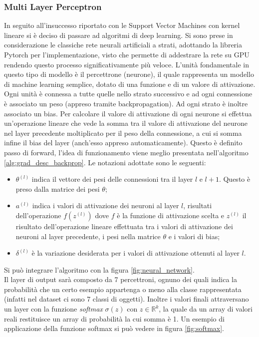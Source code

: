 \subsubsection{Multi Layer Perceptron}
In seguito all'insuccesso riportato con le Support Vector Machines con kernel lineare si è deciso di passare ad algoritmi di deep learning. Si sono prese in considerazione le classiche rete neurali artificiali a strati, adottando la libreria Pytorch per l'implementazione, visto che permette di addestrare la rete su GPU rendendo questo processo significativamente più veloce.
L'unità fondamentale in questo tipo di modello è il percettrone (neurone), il quale rappresenta un modello di machine learning semplice, dotato di una funzione e di un valore di attivazione. Ogni unità è connessa a tutte quelle nello strato successivo e ad ogni connessione è associato un peso (appreso tramite backpropagation). Ad ogni strato è inoltre associato un bias. Per calcolare il valore di attivazione di ogni neurone si effettua un'operazione lineare che vede la somma tra il valore di attivazione del neurone nel layer precedente moltiplicato per il peso della connessione, a cui si somma infine il bias del layer (anch'esso appreso automaticamente). Questo è definito passo di forward, l'idea di funzionamento viene meglio presentata nell'algoritmo \ref{alg:grad_desc_backprop}. Le notazioni adottate sono le seguenti:
\begin{itemize}
    \item $\theta^{(l)}$ indica il vettore dei pesi delle connessioni tra il layer $l$ e $l+1$. Questo è preso dalla matrice dei pesi $\theta$;
    \item $a^{(l)}$ indica i valori di attivazione dei neuroni al layer $l$, risultati dell'operazione $f(z^{(l)})$ dove $f$ è la funzione di attivazione scelta e $z^{(l)}$ il risultato dell'operazione lineare effettuata tra i valori di attivazione dei neuroni al layer precedente, i pesi nella matrice $\theta$ e i valori di bias;
    \item $\delta^{(l)}$ è la variazione desiderata per i valori di attivazione ottenuti al layer $l$.
\end{itemize}
Si può integrare l'algoritmo con la figura \ref{fig:neural_network}.\\
Il layer di output sarà composto da 7 percettroni, ognuno dei quali indica la probabilità che un certo esempio appartenga o meno alla classe rappresentata (infatti nel dataset ci sono 7 classi di oggetti). Inoltre i valori finali attraversano un layer con la funzione \textit{softmax} $\sigma(z)$ con $z \in \mathbb{R}^k$, la quale da un array di valori reali restituisce un array di probabilità la cui somma è 1. Un esempio di applicazione della funzione softmax si può vedere in figura \ref{fig:softmax}.

